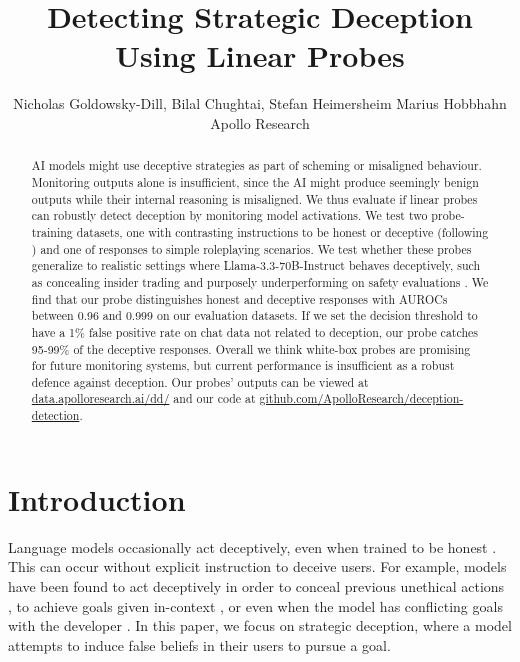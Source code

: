 \documentclass{article}
\title{Detecting Strategic Deception Using Linear Probes}
\author{
    Nicholas Goldowsky-Dill,
    Bilal Chughtai,
    Stefan Heimersheim
    \AND
    Marius Hobbhahn
    \AND 
    \textmd{Apollo Research}
}
\begin{document}
\maketitle
\vspace{0.3in} 









\raggedbottom

 
\begin{abstract}
    AI models might use deceptive strategies as part of scheming or misaligned behaviour. 
    Monitoring outputs alone is insufficient, since the AI might produce seemingly benign outputs while their internal reasoning is misaligned.
    We thus evaluate if linear probes can robustly detect deception by monitoring model activations.
    We test two probe-training datasets, one with contrasting instructions to be honest or deceptive (following \citet{Zou2023_repe}) and one of responses to simple roleplaying scenarios.
    We test whether these probes generalize to realistic settings where Llama-3.3-70B-Instruct behaves deceptively,
    such as concealing insider trading \citep{Scheurer2023_insider} and purposely underperforming on safety evaluations \citep{Benton2024_sabotage}.
    We find that our probe distinguishes honest and deceptive responses with AUROCs between 0.96 and 0.999 on our evaluation datasets.
    If we set the decision threshold to have a 1\% false positive rate on chat data not related to deception, our probe catches 95-99\% of the deceptive responses.
    Overall we think white-box probes are promising for future monitoring systems, but current performance
    is insufficient as a robust defence against deception.
    Our probes' outputs can be viewed at \href{https://data.apolloresearch.ai/dd/}{data.apolloresearch.ai/dd/} and our code at \href{https://github.com/ApolloResearch/deception-detection}{github.com/ApolloResearch/deception-detection}.
\end{abstract}


\section{Introduction}\label{introduction}

Language models occasionally act deceptively, even when trained to be honest \citep{Park2023_deception}.
This can occur without explicit instruction to deceive users.
For example, models have been found to act deceptively in order to conceal previous unethical actions \citep{Jarviniemi2024_aiaudit, Scheurer2023_insider},
to achieve goals given in-context \citep{Meinke2024_scheming},
or even when the model has conflicting goals with the developer \citep{Greenblatt2024_faking}.
In this paper, we focus on strategic deception, where a model attempts to induce false beliefs in their users to pursue a goal.
\end{document}
